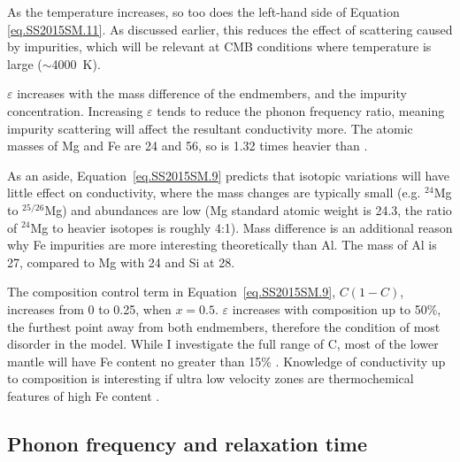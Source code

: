 As the temperature increases, so too does the left-hand side of Equation \ref{eq.SS2015SM.11}. As discussed earlier, this reduces the effect of scattering caused by impurities, which will be relevant at CMB conditions where temperature is large ($\sim$4000~K). 

$\varepsilon$ increases with the mass difference of the endmembers, and the impurity concentration. Increasing $\varepsilon$ tends to reduce the phonon frequency ratio, meaning impurity scattering will affect the resultant conductivity more. The atomic masses of Mg and Fe are 24 and 56, so \fesios is 1.32 times heavier than \mgsio. 

As an aside, Equation~\ref{eq.SS2015SM.9} predicts that isotopic variations will have little effect on conductivity, where the mass changes are typically small (e.g. $^{24}$Mg to $^{25/26}$Mg) and abundances are low (Mg standard atomic weight is 24.3, the ratio of $^{24}$Mg to heavier isotopes is roughly 4:1). Mass difference is an additional reason why Fe impurities are more interesting theoretically than Al. The mass of Al is 27, compared to Mg with 24 and Si at 28.

The composition control term in Equation~\ref{eq.SS2015SM.9}, $C(1-C)$, increases from 0 to 0.25, when $x = 0.5$. $\varepsilon$ increases with composition up to 50\%, the furthest point away from both endmembers, therefore the condition of most disorder in the model. While I investigate the full range of C, most of the lower mantle will have Fe content no greater than 15\% \citep{Lee2004}. Knowledge of conductivity up to \fesios composition is interesting if ultra low velocity zones are thermochemical features of high Fe content \citep[e.g.][]{Mao2004, Dobson2005}. 


\subsection{Phonon frequency and relaxation time} 

